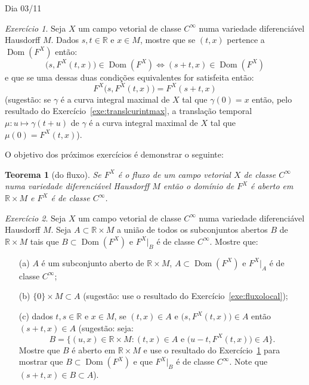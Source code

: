 \documentclass[oneside,11pt]{amsart}
\newcommand{\R}{\mathds R}
\DeclareMathOperator{\Dom}{Dom}
\theoremstyle{remark}\newtheorem{exercise}{Exercício}[section]
\theoremstyle{plain}\newtheorem{teo}{Teorema}[section]
\theoremstyle{plain}\newtheorem{lem}[teo]{Lema}
\theoremstyle{plain}\newtheorem{prop}[teo]{Proposição}
\theoremstyle{definition}\newtheorem{defin}[teo]{Definição}
\theoremstyle{remark}\newtheorem{rem}[teo]{Observação}
\theoremstyle{definition}\newtheorem{example}[teo]{Exemplo}
\numberwithin{equation}{section}
\begin{document}
\begin{section}{Dia 03/11}
\begin{exercise}\label{exe:FsFtx}
Seja $X$ um campo vetorial de classe $C^\infty$ numa variedade diferenciável Hausdorff $M$. Dados $s,t\in\R$ e $x\in M$, mostre que se $(t,x)$ pertence a
$\Dom(F^X)$ então:
\[\big(s,F^X(t,x)\big)\in\Dom(F^X)\Longleftrightarrow(s+t,x)\in\Dom(F^X)\]
e que se uma dessas duas condições equivalentes for satisfeita então:
\[F^X\big(s,F^X(t,x)\big)=F^X(s+t,x)\]
(sugestão: se $\gamma$ é a curva integral maximal de $X$ tal que $\gamma(0)=x$ então, pelo resultado do Exercício~\ref{exe:translcurintmax}, a translação temporal
$\mu:u\mapsto\gamma(t+u)$ de $\gamma$ é a curva integral maximal de $X$ tal que $\mu(0)=F^X(t,x)$).
\end{exercise}

O objetivo dos próximos exercícios é demonstrar o seguinte:
\begin{teo}[do fluxo]\label{thm:fluxo}
Se $F^X$ é o fluxo de um campo vetorial $X$ de classe $C^\infty$ numa variedade diferenciável Hausdorff $M$ então o domínio de $F^X$ é aberto em $\R\times M$
e $F^X$ é de classe $C^\infty$.
\end{teo}

\begin{exercise}\label{exe:prepfluxo}
Seja $X$ um campo vetorial de classe $C^\infty$ numa variedade diferenciável Hausdorff $M$.
Seja $A\subset\R\times M$ a união de todos os subconjuntos abertos $B$ de $\R\times M$ tais que $B\subset\Dom(F^X)$ e $F^X\vert_B$ é de classe $C^\infty$.
Mostre que:
\begin{itemize}
\item[(a)] $A$ é um subconjunto aberto de $\R\times M$, $A\subset\Dom(F^X)$ e $F^X\vert_A$ é de classe $C^\infty$;
\item[(b)] $\{0\}\times M\subset A$ (sugestão: use o resultado do Exercício~\ref{exe:fluxolocal});
\item[(c)] dados $t,s\in\R$ e $x\in M$, se $(t,x)\in A$ e $\big(s,F^X(t,x)\big)\in A$ então $(s+t,x)\in A$ (sugestão:
seja:
\[B=\big\{(u,x)\in\R\times M:\text{$(t,x)\in A$ e $\big(u-t,F^X(t,x)\big)\in A$}\big\}.\]
Mostre que $B$ é aberto em $\R\times M$
e use o resultado do Exercício~\ref{exe:FsFtx} para mostrar que $B\subset\Dom(F^X)$ e que $F^X\vert_B$ é de classe $C^\infty$. Note que
$(s+t,x)\in B\subset A$).
\end{itemize}
\end{exercise}


\end{section}
\end{document}
